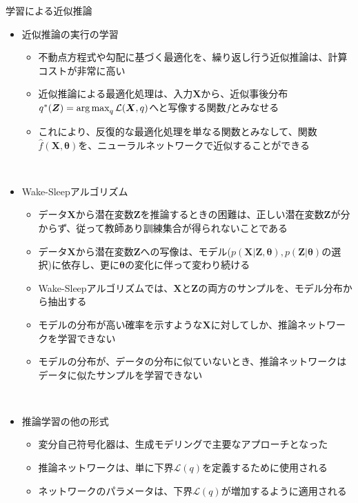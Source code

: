 \documentclass[dvipdfmx,notheorems,t]{beamer}
\begin{document}
\begin{frame}{学習による近似推論}

\begin{itemize}
	\item 近似推論の実行の学習
	\begin{itemize}
		\item 不動点方程式や勾配に基づく最適化を、繰り返し行う近似推論は、計算コストが非常に高い
		\newline
		\item 近似推論による最適化処理は、入力$\bm{X}$から、近似事後分布$q^*(\bm{Z}) = \operatorname*{arg\,max}_q \mathcal{L}(\bm{X}, q)$へと写像する関数$f$とみなせる
		\item これにより、反復的な最適化処理を単なる関数とみなして、関数$\widehat{f}(\bm{X}, \bm{\theta})$を、ニューラルネットワークで近似することができる
	\end{itemize} \
	
	\item Wake-Sleepアルゴリズム
	\begin{itemize}
		\item データ$\bm{X}$から潜在変数$\bm{Z}$を推論するときの困難は、正しい潜在変数$\bm{Z}$が分からず、従って\alert{教師あり訓練集合}が得られないことである
		\item データ$\bm{X}$から潜在変数$\bm{Z}$への写像は、モデル($p(\bm{X} | \bm{Z}, \bm{\theta}), p(\bm{Z} | \bm{\theta})$の選択)に依存し、更に$\bm{\theta}$の変化に伴って変わり続ける
		\newline
		
		\item Wake-Sleepアルゴリズムでは、$\bm{X}$と$\bm{Z}$の両方のサンプルを、モデル分布から抽出する
		\item モデルの分布が高い確率を示すような$\bm{X}$に対してしか、推論ネットワークを学習できない
		\newline
		\item モデルの分布が、データの分布に似ていないとき、推論ネットワークはデータに似たサンプルを学習できない
	\end{itemize} \
	
	\item 推論学習の他の形式
	\begin{itemize}
		\item \alert{変分自己符号化器}は、生成モデリングで主要なアプローチとなった
		\newline
		\item 推論ネットワークは、単に下界$\mathcal{L}(q)$を定義するために使用される
		\item ネットワークのパラメータは、下界$\mathcal{L}(q)$が増加するように適用される
	\end{itemize}
\end{itemize}

\end{frame}

\end{document}
